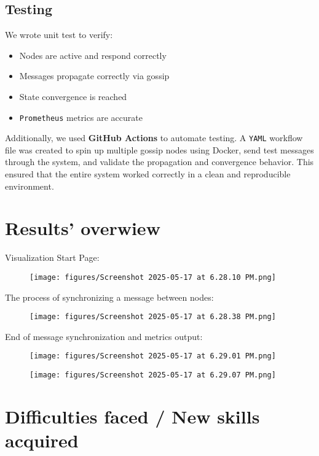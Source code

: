 \documentclass[a4paper,12pt]{article}
\begin{document}
\subsection*{Testing}
We wrote unit test to verify:
\begin{itemize}
    \item Nodes are active and respond correctly
    \item Messages propagate correctly via gossip
    \item State convergence is reached
    \item \verb|Prometheus| metrics are accurate
\end{itemize}
Additionally, we used \textbf{GitHub Actions} to automate testing. A \verb|YAML| workflow file was created to spin up multiple gossip nodes using Docker, send test messages through the system, and validate the propagation and convergence behavior. This ensured that the entire system worked correctly in a clean and reproducible environment.

\section{Results' overwiew}

Visualization Start Page:
\begin{figure}[H]
    \centering
    \texttt{[image: figures/Screenshot 2025-05-17 at 6.28.10 PM.png]}
    \label{fig:screenshot1}
\end{figure}
The process of synchronizing a message between nodes:
\begin{figure}[H]
    \centering
    \texttt{[image: figures/Screenshot 2025-05-17 at 6.28.38 PM.png]}
    \label{fig:screenshot2}
\end{figure}
End of message synchronization and metrics output:
\begin{figure}[H]
    \centering
    \texttt{[image: figures/Screenshot 2025-05-17 at 6.29.01 PM.png]}
    \label{fig:screenshot3}
\end{figure}
\begin{figure}[H]
    \centering
    \texttt{[image: figures/Screenshot 2025-05-17 at 6.29.07 PM.png]}
    \label{fig:screenshot4}
\end{figure}


\section{Difficulties faced / New skills acquired}
\end{document}
